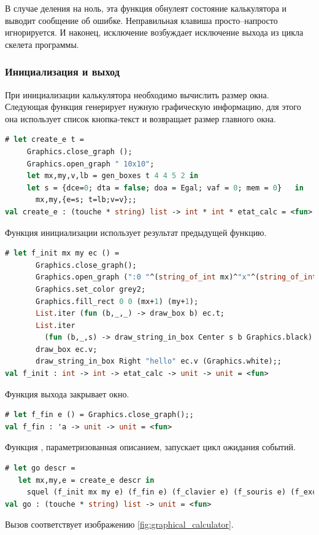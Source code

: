 В случае деления на ноль, эта функция обнулеят состояние калькулятора и выводит 
сообщение об ошибке. Неправильная клавиша просто--напросто игнорируется. И 
наконец, исключение  возбуждает исключение  выхода из 
цикла скелета программы.

\subsubsection{Инициализация и выход}

При инициализации калькулятора необходимо вычислить размер окна. Следующая 
функция генерирует нужную графическую информацию, для этого она использует 
список кнопка-текст и возвращает размер главного окна.

\begin{lstlisting}[language=OCaml]
# let create_e t = 
     Graphics.close_graph ();
     Graphics.open_graph " 10x10";
     let mx,my,v,lb = gen_boxes t 4 4 5 2 in 
     let s = {dce=0; dta = false; doa = Egal; vaf = 0; mem = 0}   in 
       mx,my,{e=s; t=lb;v=v};;
val create_e : (touche * string) list -> int * int * etat_calc = <fun>
\end{lstlisting}

Функция инициализации использует результат предыдущей функцию. 

\begin{lstlisting}[language=OCaml]
# let f_init mx my ec () = 
       Graphics.close_graph();
       Graphics.open_graph (":0 "^(string_of_int mx)^"x"^(string_of_int my));
       Graphics.set_color grey2;
       Graphics.fill_rect 0 0 (mx+1) (my+1);
       List.iter (fun (b,_,_) -> draw_box b) ec.t;
       List.iter 
         (fun (b,_,s) -> draw_string_in_box Center s b Graphics.black) ec.t ;
       draw_box ec.v;
       draw_string_in_box Right "hello" ec.v (Graphics.white);;
val f_init : int -> int -> etat_calc -> unit -> unit = <fun>
\end{lstlisting}

Функция выхода закрывает окно.

\begin{lstlisting}[language=OCaml]
# let f_fin e () = Graphics.close_graph();;
val f_fin : 'a -> unit -> unit = <fun>
\end{lstlisting}

Функция , параметризованная описанием, запускает цикл ожидания событий.

\begin{lstlisting}[language=OCaml]
# let go descr = 
   let mx,my,e = create_e descr in
     squel (f_init mx my e) (f_fin e) (f_clavier e) (f_souris e) (f_exc e);;
val go : (touche * string) list -> unit = <fun>
\end{lstlisting}

Вызов  соответствует изображению 
\ref{fig:graphical_calculator}.
